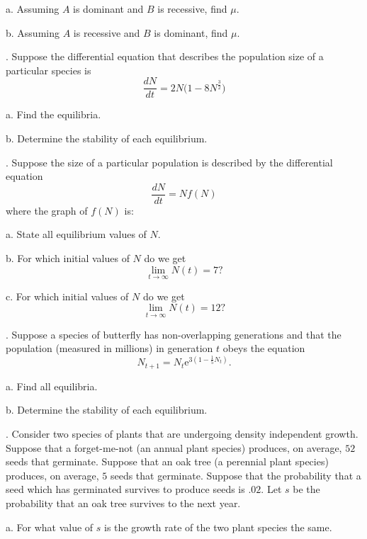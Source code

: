 \documentclass[reqno,12pt]{amsart}
\def\eee{\textrm{e}}
\def \dNdt{\frac{dN}{dt}}
\begin{document}
\noindent
a.  Assuming $A$ is dominant and $B$ is recessive, find $\mu$.

\noindent
b.  Assuming $A$ is recessive and $B$ is dominant, find $\mu$.

\vspace{1cm}

. Suppose the differential equation that describes the population
size of a particular species is
$$
\dNdt = 2 N \bigl( 1 - 8 N^{\frac 32} \bigr)
$$

\noindent
a.  Find the equilibria.

\noindent
b.  Determine the stability of each equilibrium.

\vspace{1cm}

.  Suppose the size of a particular population is described by
the differential equation
$$
\dNdt = N f(N)
$$
where the graph of $f(N)$ is:

\vspace{8cm}

\noindent
a.  State all equilibrium values of $N$.

\noindent
b.  For which initial values of $N$ do we get
$$
\lim_{t \to \infty} N(t) = 7?
$$

\noindent
c.  For which initial values of $N$ do we get
$$
\lim_{t \to \infty} N(t) = 12?
$$

\vspace{1cm}

.  Suppose a species of butterfly has non-overlapping generations
and that the population (measured in millions) in generation $t$
obeys the equation
$$
N_{t+1} = N_t \eee^{3(1- \frac 15 N_t)}.
$$

\noindent
a.  Find all equilibria.

\noindent
b.  Determine the stability of each equilibrium.

\vspace{1cm}

.  Consider two species of plants that are undergoing density
independent growth.  Suppose that a forget-me-not (an annual plant
species) produces, on average, $52$ seeds that germinate.  Suppose
that an oak tree (a perennial plant species) produces, on average,
$5$ seeds that germinate.  Suppose that the probability that a seed
which has germinated survives to produce seeds is $.02$.  Let $s$
be the probability that an oak tree survives to the next year.

\noindent
a.  For what value of $s$ is the growth rate of the two plant
species the same.
\end{document}

